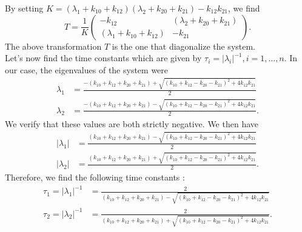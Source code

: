 By setting $K = (\lambda_1 +k_{10} + k_{12})(\lambda_2 +k_{20} + k_{21})-k_{12}k_{21}$, we find
$$T = \frac{1}{K}
\begin{pmatrix}
-k_{12} & (\lambda_2 +k_{20} + k_{21})\\
(\lambda_1 +k_{10} + k_{12}) & -k_{21}
\end{pmatrix}.$$
The above transformation $T$ is the one that diagonalize the system.\\
Let's now find the time constants which are given by $\tau_i = |\lambda_i|^{-1},i=1,\hdots,n$. In our case, the eigenvalues of the system were
\begin{align*}
\lambda_1 & = \frac{-(k_{10}+k_{12}+k_{20}+k_{21}) + \sqrt{(k_{10}+k_{12}-k_{20}-k_{21})^2+4k_{12}k_{21}}}{2}\\
\lambda_2 & = \frac{-(k_{10}+k_{12}+k_{20}+k_{21}) - \sqrt{(k_{10}+k_{12}-k_{20}-k_{21})^2+4k_{12}k_{21}}}{2}.
\end{align*}
We verify that these values are both strictly negative. We then have
\begin{align*}
|\lambda_1| & = \frac{(k_{10}+k_{12}+k_{20}+k_{21}) - \sqrt{(k_{10}+k_{12}-k_{20}-k_{21})^2+4k_{12}k_{21}}}{2}\\
|\lambda_2| & = \frac{(k_{10}+k_{12}+k_{20}+k_{21}) + \sqrt{(k_{10}+k_{12}-k_{20}-k_{21})^2+4k_{12}k_{21}}}{2}.
\end{align*}
Therefore, we find the following time constants :
\begin{align*}
\tau_1 = |\lambda_1|^{-1} & = \frac{2}{(k_{10}+k_{12}+k_{20}+k_{21}) - \sqrt{(k_{10}+k_{12}-k_{20}-k_{21})^2+4k_{12}k_{21}}}\\
\tau_2 = |\lambda_2|^{-1} & = \frac{2}{(k_{10}+k_{12}+k_{20}+k_{21}) + \sqrt{(k_{10}+k_{12}-k_{20}-k_{21})^2+4k_{12}k_{21}}}.
\end{align*}